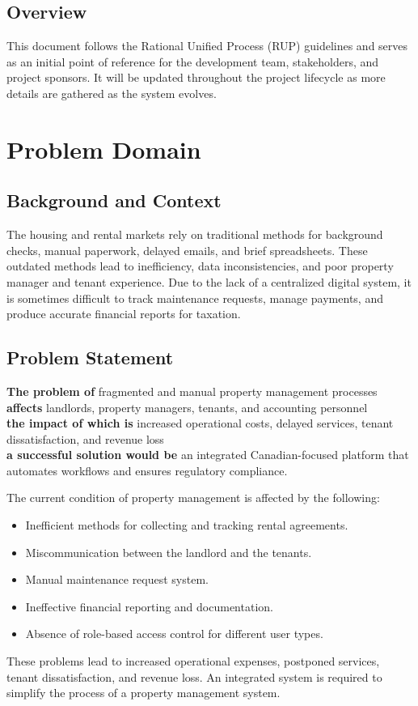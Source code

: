 \documentclass[12pt]{article}
\begin{document}
\subsection{Overview}
This document follows the Rational Unified Process (RUP) guidelines and serves as an initial point of reference for the development team, stakeholders, and project sponsors. It will be updated throughout the project lifecycle as more details are gathered as the system evolves.

\section{Problem Domain}

\subsection{Background and Context}
The housing and rental markets rely on traditional methods for background checks, manual paperwork, delayed emails, and brief spreadsheets. These outdated methods lead to inefficiency, data inconsistencies, and poor property manager and tenant experience. Due to the lack of a centralized digital system, it is sometimes difficult to track maintenance requests, manage payments, and produce accurate financial reports for taxation.   

\subsection{Problem Statement}
\textbf{The problem of} fragmented and manual property management processes \\
\textbf{affects} landlords, property managers, tenants, and accounting personnel \\
\textbf{the impact of which is} increased operational costs, delayed services, tenant dissatisfaction, and revenue loss \\
\textbf{a successful solution would be} an integrated Canadian-focused platform that automates workflows and ensures regulatory compliance.

The current condition of property management is affected by the following:
\begin{itemize}
    \item Inefficient methods for collecting and tracking rental agreements.
    \item Miscommunication between the landlord and the tenants.
    \item Manual maintenance request system.
    \item Ineffective financial reporting and documentation.
    \item Absence of role-based access control for different user types.
\end{itemize}
These problems lead to increased operational expenses, postponed services, tenant dissatisfaction, and revenue loss. An integrated system is required to simplify the process of a property management system.
\end{document}
